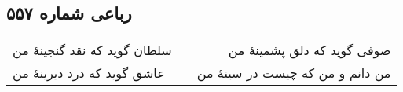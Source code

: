 \begin{center}
\section*{رباعی شماره ۵۵۷}
\label{sec:sh557}
\begin{longtable}{l p{0.5cm} r}
سلطان گوید که نقد گنجینهٔ من
&&
صوفی گوید که دلق پشمینهٔ من
\\
عاشق گوید که درد دیرینهٔ من
&&
من دانم و من که چیست در سینهٔ من
\\
\end{longtable}
\end{center}
